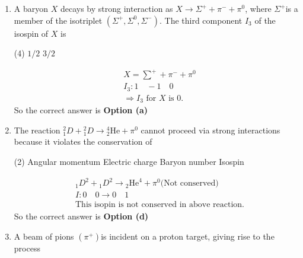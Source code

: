 \begin{enumerate}
\begin{tasks}
		,1
		\task[\textbf{c.}]$\frac{1}{2}$ only
		\task[\textbf{d.}]$\frac{1}{2}, \frac{3}{2}, \frac{5}{2}, \frac{7}{2}, \ldots$ 
	\end{tasks}
	\begin{answer}
		Spin of the left side and combined spin of the products must be same to conserve the spin angular momentum conservation law.\\\\
		So the correct answer is \textbf{Option (c)}
	\end{answer}
	\item  A baryon $X$ decays by strong interaction as $X \rightarrow \Sigma^{+}+\pi^{-}+\pi^0$, where $\Sigma^{+}$is a member of the isotriplet $\left(\Sigma^{+}, \Sigma^0, \Sigma^{-}\right)$. The third component $I_3$ of the isospin of $X$ is
	{}
	\begin{tasks}(4)
		\task[\textbf{b.}] $1 / 2$
		\task[\textbf{d.}] $3 / 2$
	\end{tasks}
	\begin{answer}
		\begin{align*}
		&X=\sum^{+}+\pi^{-}+\pi^0\\
		&I_3: 1\quad-1 \quad 0\\
		&\Rightarrow I_3 \text { for } X \text { is } 0 \text {. }
		\end{align*}
		So the correct answer is \textbf{Option (a)}
	\end{answer}
	\item  The reaction ${ }_1^2 D+{ }_1^2 D \rightarrow{ }_2^4 \mathrm{He}+\pi^0$ cannot proceed via strong interactions because it violates the conservation of
	{}
	\begin{tasks}(2)
		\task[\textbf{a.}]Angular momentum
		\task[\textbf{b.}]Electric charge
		\task[\textbf{c.}]Baryon number
		\task[\textbf{d.}] Isospin 
	\end{tasks}
	\begin{answer}
		\begin{align*}
		&{ }_1 D^2+{ }_1 D^2 \rightarrow{ }_2 \mathrm{He}^4+\pi^0
		\text{(Not conserved)}\\
		&I: 0 \quad 0 \rightarrow 0 \quad 1\\
		&\text{This isopin is not conserved in above reaction.}
		\end{align*}
		So the correct answer is \textbf{Option (d)}
	\end{answer}
	\item  A beam of pions $\left(\pi^{+}\right)$is incident on a proton target, giving rise to the process

\end{enumerate}
